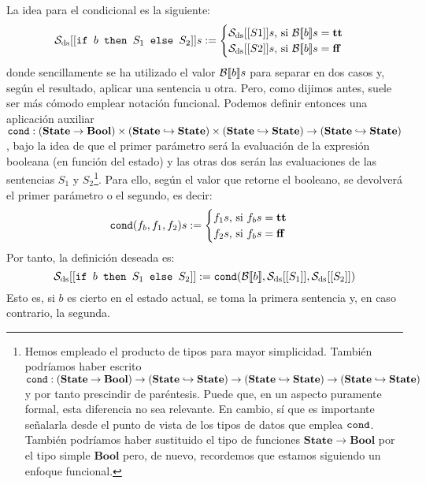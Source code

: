 La idea para el condicional es la siguiente:
\[
    \mathcal{S}_{\mathrm{ds}} [[\texttt{if } b\texttt{ then } S_1\texttt{ else } S_2]]s := 
    \begin{cases}  
        \mathcal{S}_{\mathrm{ds}} [[S1]]s\text{, si } \mathcal{B}[\![b]\!]s = \textbf{tt} \\
        \mathcal{S}_{\mathrm{ds}} [[S2]]s\text{, si } \mathcal{B}[\![b]\!]s = \textbf{ff}
   \end{cases}
\]
donde sencillamente se ha utilizado el valor $\mathcal{B}[\![b]\!]s$ para separar en dos casos y, según el resultado, aplicar una sentencia u otra. Pero, como dijimos antes, suele ser más cómodo emplear notación funcional. Podemos definir entonces una aplicación auxiliar $\texttt{cond} : (\textbf{State} \to \mathbf{Bool}) \times (\textbf{State} \hookrightarrow  \textbf{State}) \times (\textbf{State} \hookrightarrow  \textbf{State}) \to (\textbf{State} \hookrightarrow  \textbf{State})$, bajo la idea de que el primer parámetro será la evaluación de la expresión booleana (en función del estado) y las otras dos serán las evaluaciones de las sentencias $S_1$ y $S_2$\footnote{Hemos empleado el producto de tipos para mayor simplicidad. También podríamos haber escrito $\texttt{cond} : (\textbf{State} \to \mathbf{Bool}) \to (\textbf{State} \hookrightarrow  \textbf{State}) \to (\textbf{State} \hookrightarrow  \textbf{State}) \to (\textbf{State} \hookrightarrow  \textbf{State})$ y por tanto prescindir de paréntesis. Puede que, en un aspecto puramente formal, esta diferencia no sea relevante. En cambio, sí que es importante señalarla desde el punto de vista de los tipos de datos que emplea $\texttt{cond}$. También podríamos haber sustituido el tipo de funciones $\mathbf{State}\to \mathbf{Bool}$ por el tipo simple $\mathbf{Bool}$ pero, de nuevo, recordemos que estamos siguiendo un enfoque funcional.}. Para ello, según el valor que retorne el booleano, se devolverá el primer parámetro o el segundo, es decir:
\[
    \texttt{cond}(f_b, f_1, f_2) s := 
    \begin{cases}
        
        f_1s\text{, si } f_bs = \textbf{tt}  \\
        f_2 s\text{, si } f_bs = \textbf{ff} 
    \end{cases}
\]
Por tanto, la definición deseada es:
\[
    \mathcal{S}_{\mathrm{ds}} [[\texttt{if } b\texttt{ then } S_1\texttt{ else } S_2]] := \texttt{cond}(\mathcal{B}[\![b]\!], \mathcal{S}_{\mathrm{ds}} [[S_1]], \mathcal{S}_{\mathrm{ds}} [[S_2]])
\]
Esto es, si $b$ es cierto en el estado actual, se toma la primera sentencia y, en caso contrario, la segunda. 
\\

